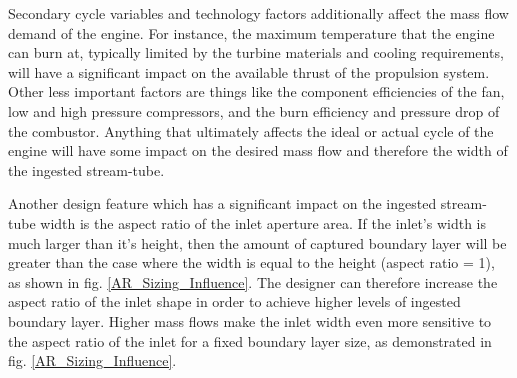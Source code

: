 					Secondary cycle variables and technology factors additionally affect the mass flow demand of the engine.  For instance, the maximum temperature that the engine can burn at, typically limited by the turbine materials and cooling requirements, will have a significant impact on the available thrust of the propulsion system.  Other less important factors are things like the component efficiencies of the fan, low and high pressure compressors, and the burn efficiency and pressure drop of the combustor.  Anything that ultimately affects the ideal or actual cycle of the engine will have some impact on the desired mass flow and therefore the width of the ingested stream-tube.
					
					Another design feature which has a significant impact on the ingested stream-tube width is the aspect ratio of the inlet aperture area.  If the inlet's width is much larger than it's height, then the amount of captured boundary layer will be greater than the case where the width is equal to the height (aspect ratio = 1), as shown in fig. \ref{AR_Sizing_Influence}.  The designer can therefore increase the aspect ratio of the inlet shape in order to achieve higher levels of ingested boundary layer.  Higher mass flows make the inlet width even more sensitive to the aspect ratio of the inlet for a fixed boundary layer size, as demonstrated in fig. \ref{AR_Sizing_Influence}.
					
